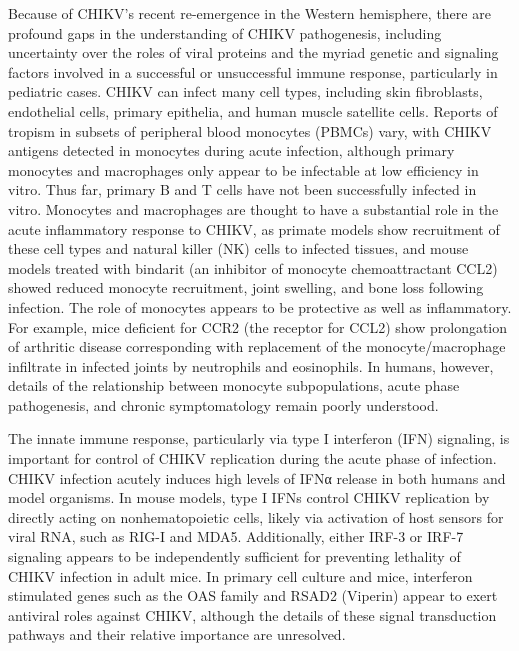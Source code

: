Because of CHIKV’s recent re-emergence in the Western hemisphere, there are profound gaps in the understanding of CHIKV pathogenesis, including uncertainty over the roles of viral proteins and the myriad genetic and signaling factors involved in a successful or unsuccessful immune response, particularly in pediatric cases.\autocite{Teng2015} CHIKV can infect many cell types, including skin fibroblasts, endothelial cells, primary epithelia, and human muscle satellite cells.\autocite{Couderc2015,Lum2015} Reports of tropism in subsets of peripheral blood monocytes (PBMCs) vary, with CHIKV antigens detected in monocytes during acute infection,\autocite{Her2010} although primary monocytes and macrophages only appear to be infectable at low efficiency in vitro.\autocite{Sourisseau2007,Teng2012a} Thus far, primary B and T cells have not been successfully infected in vitro.\autocite{Her2010,Sourisseau2007,Teng2012a} Monocytes and macrophages are thought to have a substantial role in the acute inflammatory response to CHIKV, as primate models show recruitment of these cell types and natural killer (NK) cells to infected tissues,\autocite{Labadie2010} and mouse models treated with bindarit (an inhibitor of monocyte chemoattractant CCL2) showed reduced monocyte recruitment, joint swelling, and bone loss following infection.\autocite{Chen2015,Rulli2011} The role of monocytes appears to be protective as well as inflammatory. For example, mice deficient for CCR2 (the receptor for CCL2) show prolongation of arthritic disease corresponding with replacement of the monocyte/macrophage infiltrate in infected joints by neutrophils and eosinophils.\autocite{Poo2014} In humans, however, details of the relationship between monocyte subpopulations, acute phase pathogenesis, and chronic symptomatology remain poorly understood.\autocite{Burt2017,Weaver2015}

The innate immune response, particularly via type I interferon (IFN) signaling, is important for control of CHIKV replication during the acute phase of infection.\autocite{Burt2017,Schilte2010} CHIKV infection acutely induces high levels of IFNα release in both humans and model organisms.\autocite{Labadie2010,Teng2015} In mouse models, type I IFNs control CHIKV replication by directly acting on nonhematopoietic cells, likely via activation of host sensors for viral RNA, such as RIG-I and MDA5.\autocite{Schilte2010} Additionally, either IRF-3 or IRF-7 signaling appears to be independently sufficient for preventing lethality of CHIKV infection in adult mice.\autocite{Schilte2012} In primary cell culture and mice, interferon stimulated genes such as the OAS family and RSAD2 (Viperin) appear to exert antiviral roles against CHIKV, although the details of these signal transduction pathways and their relative importance are unresolved.\autocite{Burt2017}

